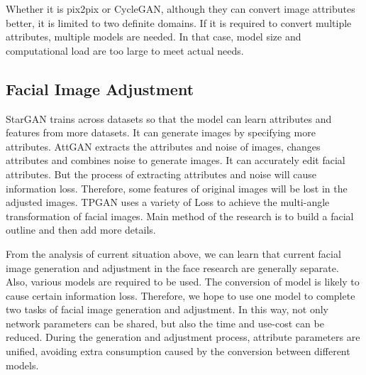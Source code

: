 Whether it is pix2pix or CycleGAN,
    although they can convert image attributes better,
    it is limited to two definite domains.
If it is required to convert multiple attributes, multiple models are needed.
In that case, model size and computational load are too large to meet actual needs.

\subsection{Facial Image Adjustment}
StarGAN trains across datasets so that the model can learn attributes and features from more datasets.
It can generate images by specifying more attributes.
AttGAN extracts the attributes and noise of images,
    changes attributes and combines noise to generate images.
It can accurately edit facial attributes.
But the process of extracting attributes and noise will cause information loss.
Therefore, some features of original images will be lost in the adjusted images.
TPGAN uses a variety of Loss to achieve the multi-angle transformation of facial images.
Main method of the research is to build a facial outline and then add more details.



\vspace{3ex}

From the analysis of current situation above,
    we can learn that current facial image generation and adjustment in the face research are generally separate.
Also, various models are required to be used.
The conversion of model is likely to cause certain information loss.
Therefore, we hope to use one model to complete two tasks of facial image generation and adjustment.
In this way, not only network parameters can be shared,
    but also the time and use-cost can be reduced.
During the generation and adjustment process, attribute parameters are unified,
    avoiding extra consumption caused by the conversion between different models.